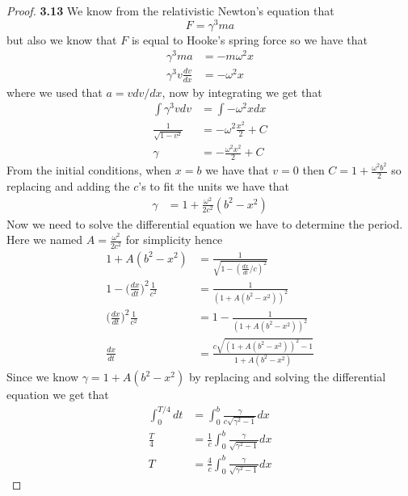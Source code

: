 \documentclass[11pt]{article}
\theoremstyle{definition}
\begin{document}
\begin{proof}{\textbf{3.13}}
    We know from the relativistic Newton's equation that
    $$F = \gamma^3ma$$
    but also we know that $F$ is equal to Hooke's spring force so
    we have that
    \begin{align*}
        \gamma^3ma &= -m\omega^2x\\
        \gamma^3v\frac{dv}{dx} &= -\omega^2x
    \end{align*}
    where we used that $a = vdv/dx$, now by integrating we get that
    \begin{align*}
        \int \gamma^3vdv &= \int -\omega^2xdx\\
        \frac{1}{\sqrt{1-v^2}} &= -\omega^2 \frac{x^2}{2} + C\\
        \gamma &= -\frac{\omega^2x^2}{2} + C
    \end{align*}
    From the initial conditions, when $x = b$ we have that $v = 0$ then
    $C = 1 + \frac{\omega^2b^2}{2}$ so replacing and adding the $c$'s to fit
    the units we have that
    \begin{align*}
        \gamma &= 1 + \frac{\omega^2}{2c^2}(b^2 - x^2)
    \end{align*}
    Now we need to solve the differential equation we have to determine the
    period. Here we named $A = \frac{\omega^2}{2c^2}$ for simplicity hence 
    \begin{align*}
        1 + A(b^2 - x^2) &= \frac{1}{\sqrt{1 - (\frac{dx}{dt}/c)^2}}\\
        1 - \bigg(\frac{dx}{dt}\bigg)^2\frac{1}{c^2} &= \frac{1}{(1 + A(b^2 - x^2))^2} \\
        \bigg(\frac{dx}{dt}\bigg)^2\frac{1}{c^2} &= 1 - \frac{1}{(1 + A(b^2 - x^2))^2} \\
        \frac{dx}{dt} &=
        \frac{c\sqrt{(1 + A(b^2 - x^2))^2 - 1}}{1 + A(b^2 - x^2)}
    \end{align*}
    Since we know $\gamma = 1 + A(b^2 - x^2)$ by replacing and solving the
    differential equation we get that
    \begin{align*}
        \int_0^{T/4} dt &= \int_0^b \frac{\gamma}{c\sqrt{\gamma^2 - 1}} dx\\
        \frac{T}{4} &= \frac{1}{c}\int_0^b \frac{\gamma}{\sqrt{\gamma^2 - 1}} dx\\
        T &= \frac{4}{c}\int_0^b \frac{\gamma}{\sqrt{\gamma^2 - 1}} dx
    \end{align*}
\end{proof}
\cleardoublepage
\end{document}
